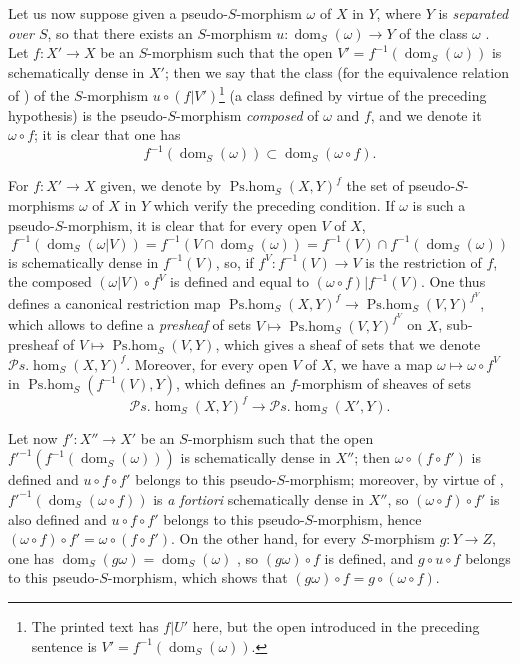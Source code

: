 \begin{env}[20.3.2]
\label{IV.20.3.2}
Let us now suppose given a pseudo-$S$-morphism $\omega$ of $X$ in $Y$, where $Y$ is \emph{separated over $S$}, so that there exists an $S$-morphism $u:\operatorname{dom}_S(\omega)\to Y$ of the class $\omega$ .
Let $f:X'\to X$ be an $S$-morphism such that the open $V'=f^{-1}(\operatorname{dom}_S(\omega))$ is schematically dense in $X'$;
then we say that the class (for the equivalence relation of ) of the $S$-morphism $u\circ(f|V')$\footnote{The printed text has $f|U'$ here, but the open introduced in the preceding sentence is $V'=f^{-1}(\operatorname{dom}_S(\omega))$.} (a class defined by virtue of the preceding hypothesis) is the pseudo-$S$-morphism \emph{composed} of $\omega$ and $f$, and we denote it $\omega\circ f$;
it is clear that one has
\[
\label{IV.20.3.2.1}
  f^{-1}(\operatorname{dom}_S(\omega))\subset\operatorname{dom}_S(\omega\circ f).
  \tag{20.3.2.1}
\]

For $f:X'\to X$ given, we denote by $\operatorname{Ps.hom}_S(X,Y)^f$ the set of pseudo-$S$-morphisms $\omega$ of $X$ in $Y$ which verify the preceding condition.
If $\omega$ is such a pseudo-$S$-morphism, it is clear that for every open $V$ of $X$,
\[
  f^{-1}(\operatorname{dom}_S(\omega|V))=f^{-1}(V\cap\operatorname{dom}_S(\omega))=f^{-1}(V)\cap f^{-1}(\operatorname{dom}_S(\omega))
\]
is schematically dense in $f^{-1}(V)$, so, if $f^V:f^{-1}(V)\to V$ is the restriction of $f$, the composed $(\omega|V)\circ f^V$ is defined and equal to $(\omega\circ f)|f^{-1}(V)$.
One thus defines a
canonical restriction map $\operatorname{Ps.hom}_S(X,Y)^f\to\operatorname{Ps.hom}_S(V,Y)^{f^V}$, which
allows to define a \emph{presheaf} of sets $V\mapsto\operatorname{Ps.hom}_S(V,Y)^{f^V}$ on $X$, sub-presheaf of $V\mapsto\operatorname{Ps.hom}_S(V,Y)$, which gives a sheaf of sets that we denote $\mathscr{P}\!s.\!\operatorname{hom}_S(X,Y)^f$.
Moreover, for every open $V$ of $X$, we have a map $\omega\mapsto\omega\circ f^V$ in $\operatorname{Ps.hom}_S(f^{-1}(V),Y)$, which defines an $f$-morphism of sheaves of sets
\[
  \mathscr{P}\!s.\!\operatorname{hom}_S(X,Y)^f\to\mathscr{P}\!s.\!\operatorname{hom}_S(X',Y).
\]
\end{env}

\begin{env}[20.3.3]
\label{IV.20.3.3}
Let now $f':X''\to X'$ be an $S$-morphism such that the open $f'^{-1}(f^{-1}(\operatorname{dom}_S(\omega)))$ is schematically dense in $X''$;
then $\omega\circ(f\circ f')$ is defined and $u\circ f\circ f'$ belongs to this pseudo-$S$-morphism;
moreover, by virtue of , $f'^{-1}(\operatorname{dom}_S(\omega\circ f))$ is \emph{a fortiori} schematically dense in $X''$, so $(\omega\circ f)\circ f'$ is also defined and $u\circ f\circ f'$ belongs to this pseudo-$S$-morphism, hence $(\omega\circ f)\circ f'=\omega\circ(f\circ f')$.
On the other hand, for every $S$-morphism $g:Y\to Z$, one has $\operatorname{dom}_S(g\omega)=\operatorname{dom}_S(\omega)$ , so $(g\omega)\circ f$ is defined, and $g\circ u\circ f$ belongs to this pseudo-$S$-morphism, which shows that $(g\omega)\circ f=g\circ(\omega\circ f)$.
\end{env}

